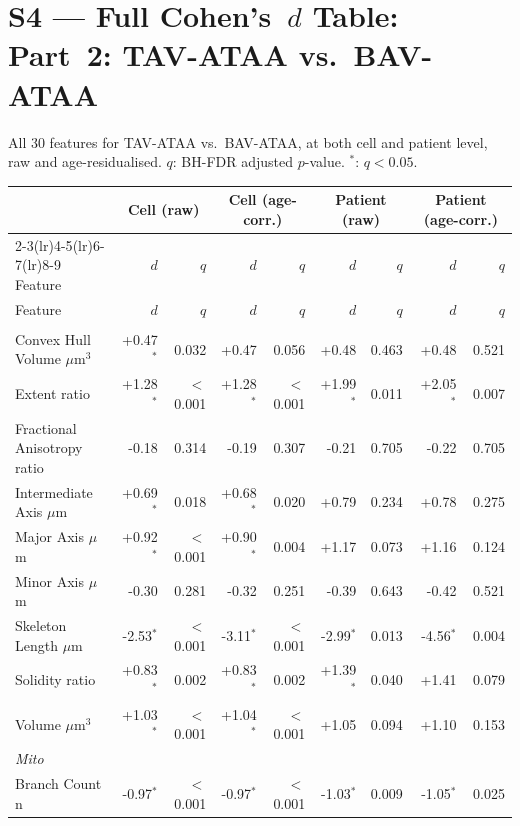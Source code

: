 \documentclass[11pt,a4paper]{article}
\begin{document}
\section*{S4 — Full Cohen's~$d$ Table: Part~2: TAV-ATAA vs.\ BAV-ATAA}
All 30 features for TAV-ATAA vs.\ BAV-ATAA, at both cell and patient level,
raw and age-residualised. $q$: BH-FDR adjusted $p$-value. $^{*}$: $q < 0.05$.
\vspace{1em}
\begin{longtable}{lrrrrrrrr}
\toprule
 & \multicolumn{2}{c}{Cell (raw)} & \multicolumn{2}{c}{Cell (age-corr.)} & \multicolumn{2}{c}{Patient (raw)} & \multicolumn{2}{c}{Patient (age-corr.)} \\
\cmidrule(lr){2-3}\cmidrule(lr){4-5}\cmidrule(lr){6-7}\cmidrule(lr){8-9}
Feature & $d$ & $q$ & $d$ & $q$ & $d$ & $q$ & $d$ & $q$ \\
\midrule\endfirsthead
\toprule Feature & $d$ & $q$ & $d$ & $q$ & $d$ & $q$ & $d$ & $q$ \\\midrule\endhead
\bottomrule\endfoot
\multicolumn{9}{l}{\textit{Actin}} \\
  Convex Hull Volume $\mu$m$^{3}$ & +0.47$^{*}$ & 0.032 & +0.47 & 0.056 & +0.48 & 0.463 & +0.48 & 0.521 \\
  Extent ratio & +1.28$^{*}$ & $<$0.001 & +1.28$^{*}$ & $<$0.001 & +1.99$^{*}$ & 0.011 & +2.05$^{*}$ & 0.007 \\
  Fractional Anisotropy ratio & -0.18 & 0.314 & -0.19 & 0.307 & -0.21 & 0.705 & -0.22 & 0.705 \\
  Intermediate Axis $\mu$m & +0.69$^{*}$ & 0.018 & +0.68$^{*}$ & 0.020 & +0.79 & 0.234 & +0.78 & 0.275 \\
  Major Axis $\mu$m & +0.92$^{*}$ & $<$0.001 & +0.90$^{*}$ & 0.004 & +1.17 & 0.073 & +1.16 & 0.124 \\
  Minor Axis $\mu$m & -0.30 & 0.281 & -0.32 & 0.251 & -0.39 & 0.643 & -0.42 & 0.521 \\
  Skeleton Length $\mu$m & -2.53$^{*}$ & $<$0.001 & -3.11$^{*}$ & $<$0.001 & -2.99$^{*}$ & 0.013 & -4.56$^{*}$ & 0.004 \\
  Solidity ratio & +0.83$^{*}$ & 0.002 & +0.83$^{*}$ & 0.002 & +1.39$^{*}$ & 0.040 & +1.41 & 0.079 \\
  Volume $\mu$m$^{3}$ & +1.03$^{*}$ & $<$0.001 & +1.04$^{*}$ & $<$0.001 & +1.05 & 0.094 & +1.10 & 0.153 \\
\midrule
\multicolumn{9}{l}{\textit{Mito}} \\
  Branch Count n & -0.97$^{*}$ & $<$0.001 & -0.97$^{*}$ & $<$0.001 & -1.03$^{*}$ & 0.009 & -1.05$^{*}$ & 0.025 \\

\end{longtable}
\end{document}
